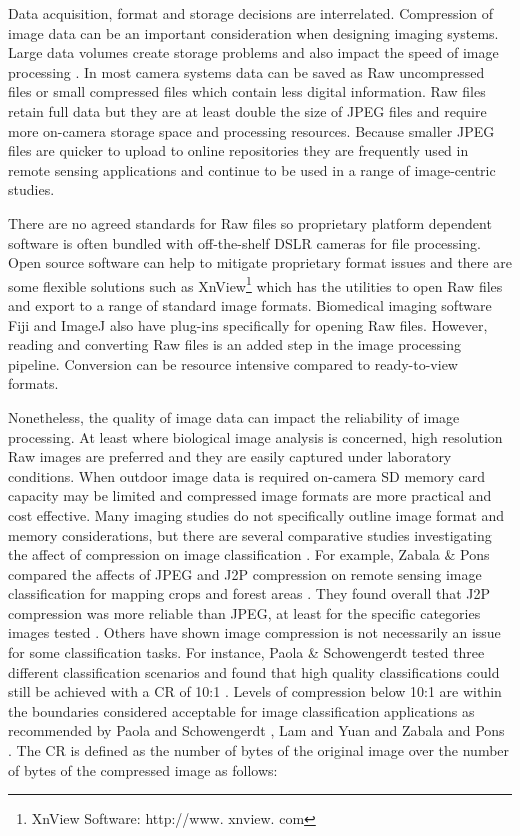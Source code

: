 Data acquisition, format and storage decisions are interrelated. Compression of image data can be an important consideration when designing imaging systems. Large data volumes create storage problems and also impact the speed of image processing \cite{Lam2001}. In most camera systems data can be saved as Raw uncompressed files or small compressed files which contain less digital information. Raw files retain full data but they are at least double the size of \ac{JPEG} files and require more on-camera storage space and processing resources. Because smaller \ac{JPEG} files are quicker to upload to online repositories they are frequently used in remote sensing applications \cite{Zabala2006,Zabala2011} and continue to be used in a range of image-centric studies. 

There are no agreed standards for Raw files so proprietary platform dependent software is often bundled with off-the-shelf \ac{DSLR} cameras for file processing. Open source software can help to mitigate proprietary format issues and there are some flexible solutions such as XnView\footnote{XnView Software: http://www. xnview. com}\cite{Xnview2013} which has the utilities to open Raw files and export to a range of standard image formats. Biomedical imaging software Fiji and ImageJ\cite{Schneider2012} also have plug-ins specifically for opening Raw files. However, reading and converting Raw files is an added step in the image processing pipeline. Conversion can be resource intensive compared to ready-to-view formats. 

Nonetheless, the quality of image data can impact the reliability of image processing. At least where biological image analysis is concerned, high resolution Raw images are preferred and they are easily captured under laboratory conditions. When outdoor image data is required on-camera \ac{SD} memory card capacity may be limited and compressed image formats are more practical and cost effective. Many imaging studies do not specifically outline image format and memory considerations, but there are several comparative studies investigating the affect of compression on image classification \cite{Lam2001}. For example, Zabala \& Pons compared the affects of \ac{JPEG} and \ac{J2P} compression on remote sensing image classification for mapping crops and forest areas \cite{Zabala2006,Zabala2011}. They found overall that J2P compression was more reliable than JPEG, at least for the specific categories images tested \cite{Zabala2006,Zabala2011}. Others have shown image compression is not necessarily an issue for some classification tasks. For instance, Paola \& Schowengerdt \cite{Paola1995} tested three different classification scenarios and found that high quality classifications could still be achieved with a \ac{CR} of 10:1 \cite{Paola1995}. Levels of compression below 10:1 are within the boundaries considered acceptable for image classification applications as recommended by Paola and Schowengerdt \cite{Paola1995}, Lam and Yuan \cite{Lam2001} and Zabala and Pons \cite{Zabala2011}. The {CR} is defined as the number of bytes of the original image over the number of bytes of the compressed image as follows:

